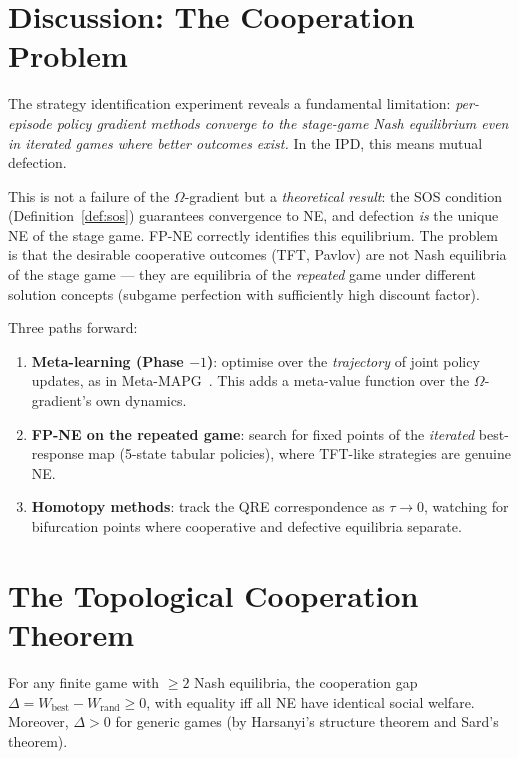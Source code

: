 \section{Discussion: The Cooperation Problem}

The strategy identification experiment reveals a fundamental limitation: \emph{per-episode policy gradient methods converge to the stage-game Nash equilibrium even in iterated games where better outcomes exist.} In the IPD, this means mutual defection.

This is not a failure of the $\Omega$-gradient but a \emph{theoretical result}: the SOS condition (Definition~\ref{def:sos}) guarantees convergence to NE, and defection \emph{is} the unique NE of the stage game. FP-NE correctly identifies this equilibrium. The problem is that the desirable cooperative outcomes (TFT, Pavlov) are not Nash equilibria of the stage game --- they are equilibria of the \emph{repeated} game under different solution concepts (subgame perfection with sufficiently high discount factor).

Three paths forward:
\begin{enumerate}
    \item \textbf{Meta-learning (Phase $-1$)}: optimise over the \emph{trajectory} of joint policy updates, as in Meta-MAPG~\cite{kim2021policygradientalgorithmlearning}. This adds a meta-value function over the $\Omega$-gradient's own dynamics.
    \item \textbf{FP-NE on the repeated game}: search for fixed points of the \emph{iterated} best-response map (5-state tabular policies), where TFT-like strategies are genuine NE.
    \item \textbf{Homotopy methods}: track the QRE correspondence as $\tau \to 0$, watching for bifurcation points where cooperative and defective equilibria separate.
\end{enumerate}


\section{The Topological Cooperation Theorem}

\begin{theorem}
For any finite game with $\geq 2$ Nash equilibria, the cooperation gap
$\Delta = W_{\text{best}} - W_{\text{rand}} \geq 0$, with equality iff
all NE have identical social welfare. Moreover, $\Delta > 0$ for generic
games (by Harsanyi's structure theorem and Sard's theorem).
\end{theorem}

